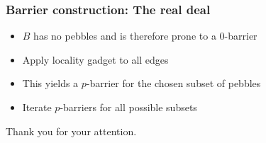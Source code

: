\documentclass{beamer}
\begin{document}
\begin{frame}
  \frametitle{Barrier construction: The real deal}
  \begin{itemize}
    \item $B$ has no pebbles and is therefore prone to a $0$-barrier
    \item Apply locality gadget to all edges
    \item This yields a $p$-barrier for the chosen subset of pebbles
    \item Iterate $p$-barriers for all possible subsets
  \end{itemize}
  \begin{center}
    \resizebox{0.8\textwidth}{!}{}
  \end{center}
\end{frame}

\begin{frame}
  \begin{center}
    \Huge Thank you for your attention.
  \end{center}
\end{frame}
\end{document}
